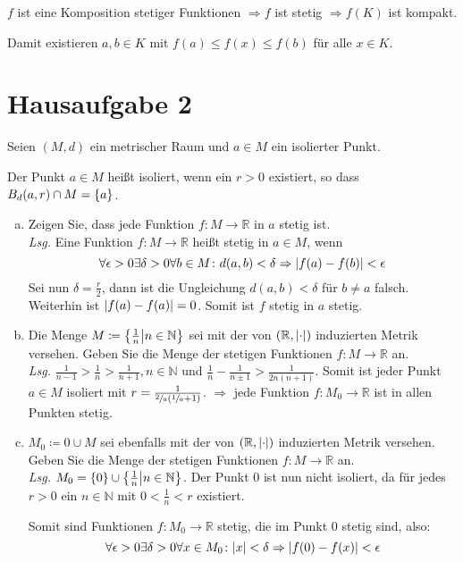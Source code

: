 \documentclass{scrreprt}
\begin{document}
$f$ ist eine Komposition stetiger Funktionen
$\Rightarrow f$ ist stetig
$\Rightarrow f(K)$ ist kompakt.

Damit existieren $a, b \in K$ mit $f(a) \leq f(x) \leq f(b)$ für alle
$x \in K$.

\newpage
\section*{Hausaufgabe 2}

Seien $(M, d)$ ein metrischer Raum und $a \in M$ ein isolierter Punkt.

\noindent
Der Punkt $a \in M$ heißt isoliert, wenn ein $r > 0$ existiert, so dass
$B_d(a, r) \cap M = \qty{a}$.

\begin{enumerate}[a)]
\item Zeigen Sie, dass jede Funktion $f \colon M \to \mathbb{R}$ in $a$
  stetig ist. \\

  \textit{Lsg.} Eine Funktion $f \colon M \to \mathbb{R}$ heißt stetig in
  $a \in M$, wenn
  \[
    \forall \epsilon > 0 \exists \delta > 0 \forall b \in M
    \colon d(a, b) < \delta \Rightarrow \abs{f(a) - f(b)} < \epsilon
  \]
  Sei nun $\delta = \frac{r}{2}$, dann ist die Ungleichung
  $d(a, b) < \delta$ für $b \ne a$ falsch.
  Weiterhin ist $\abs{f(a) - f(a)} = 0$.
  Somit ist $f$ stetig in $a$ stetig.

\item Die Menge $M \coloneqq \qty{\frac{1}{n} \middle| n \in \mathbb{N}}$
  sei mit der von $(\mathbb{R}, \abs{\cdot})$ induzierten Metrik versehen.
  Geben Sie die Menge der stetigen Funktionen $f \colon M \to \mathbb{R}$
  an. \\

  \textit{Lsg.}
  $\frac{1}{n - 1} > \frac{1}{n} > \frac{1}{n + 1}, n \in \mathbb{N}$ und
  $\frac{1}{n} - \frac{1}{n \pm 1} > \frac{1}{2n(n + 1)}$.
  Somit ist jeder Punkt $a \in M$ isoliert mit
  $r = \frac{1}{\sfrac{2}{a}\qty(\sfrac{1}{a} + 1)}$.
  $\Rightarrow$ jede Funktion $f \colon M_0 \to \mathbb{R}$ ist in allen
  Punkten stetig.

\item $M_0 \coloneqq \qty{0} \cup M$ sei ebenfalls mit der von
  $(\mathbb{R}, \abs{\cdot})$ induzierten Metrik versehen.
  Geben Sie die Menge der stetigen Funktionen $f \colon M \to \mathbb{R}$
  an. \\

  \textit{Lsg.} $M_0 = \qty{0} \cup \qty{\frac{1}{n} \middle| n \in \mathbb{N}}$.
  Der Punkt $0$ ist nun nicht isoliert, da für jedes $r > 0$ ein
  $n \in \mathbb{N}$ mit $0 < \frac{1}{n} < r$ existiert.

  Somit sind Funktionen $f \colon M_0 \to \mathbb{R}$ stetig, die im Punkt $0$
  stetig sind, also:
  \[
    \forall \epsilon > 0 \exists \delta > 0 \forall x \in M_0
    \colon \abs{x} < \delta \Rightarrow \abs{f(0) - f(x)} < \epsilon
  \]

\end{enumerate}
\end{document}
